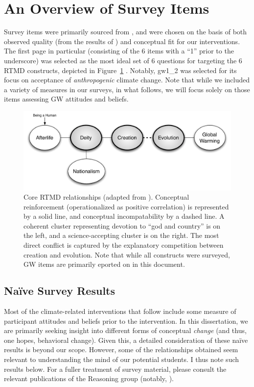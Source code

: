 \section{An Overview of Survey Items}

Survey items were primarily sourced from \textcite{martinez_factors_2009}, and
were chosen on the basis of both observed quality (from the results of
\cite{martinez_factors_2009}) and conceptual fit for our interventions. The
first page in particular (consisting of the 6 items with a “1” prior to the
underscore) was selected as the most ideal set of 6 questions for targeting the
6 RTMD constructs, depicted in Figure~\ref{fig:rtmd}
\parencite{ranney_why_2012}.  Notably, \textsf{gw1_2} was selected for its focus
on acceptance of \emph{anthropogenic} climate change. Note that while we
included a variety of measures in our surveys, in what follows, we will focus
solely on those items assessing GW attitudes and beliefs.

\begin{figure}
    \includegraphics[width=6.5in]{rtmd.pdf}
    \caption{Core RTMD relationships (adapted from \textcite{ranney_why_2012}).
        Conceptual reinforcement (operationalized as positive correlation) is
        represented by a solid line, and conceptual incompatability by a dashed
        line. A coherent cluster representing devotion to “god and country” is
        on the left, and a science-accepting cluster is on the right. The most
        direct conflict is captured by the explanatory competition between
        creation and evolution. Note that while all constructs were surveyed,
        GW items are primarily eported on in this document.}
    \label{fig:rtmd}
\end{figure}

\subsection{Na\"ive Survey Results}
\label{sec:naive}

Most of the climate-related interventions that follow include some measure of
participant attitudes and beliefs prior to the intervention. In this
dissertation, we are primarily seeking insight into different forms of
conceptual \emph{change} (and thus, one hopes, behavioral change). Given this, a
detailed consideration of these na\"ive results is beyond our scope. However,
some of the relationships obtained seem relevant to understanding the mind of
our potential students. I thus note such results below. For a fuller treatment
of survey material, please consult the relevant publications of the Reasoning
group (notably, \cite{cohen_san_2012_f,ranney_changing_2012}).


